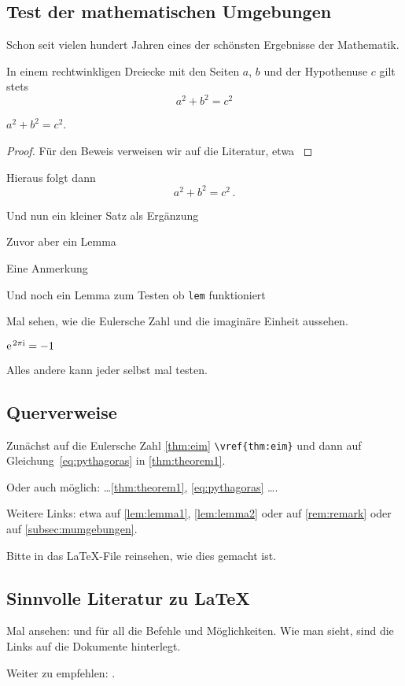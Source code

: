 \subsection{Test der mathematischen Umgebungen}\label{subsec:mumgebungen}
Schon seit vielen hundert Jahren eines der schönsten Ergebnisse der Mathematik.
%
\begin{theorem}\label{thm:theorem1}
In einem rechtwinkligen Dreiecke mit den Seiten $ a $, $ b $ und der Hypothenuse $ c $ gilt stets
\begin{equation}\label{eq:pythagoras}
a^{ 2 } +b^{ 2 } = c^{ 2 }
\end{equation}

$	a^{ 2 } +b^{ 2 } = c^{ 2 } $.
\end{theorem}
%
\begin{proof}
Für den Beweis verweisen wir auf die Literatur, etwa \textcite{efhn:2016}
\end{proof}
\begin{corollary}\label{cor:folgerung}
Hieraus folgt dann 
%
\[
	a^{ 2 } + b^{ 2 } = c^{ 2 } \, .
\]
%
\end{corollary}
%
\begin{proposition}\label{prop:prop}
Und nun ein kleiner Satz als Ergänzung 
\end{proposition}
%
\begin{lemma}\label{lem:lemma1}
Zuvor aber ein Lemma
\end{lemma}
%
\begin{remark}\label{rem:remark}
Eine Anmerkung
\end{remark}
\begin{lem}\label{lem:lemma2}
Und noch ein Lemma zum Testen ob \texttt{lem} funktioniert
\end{lem}
Mal sehen, wie die Eulersche Zahl und die imaginäre Einheit aussehen.
\begin{theorem}\label{thm:eim}
$ \mathrm{e\;\!}^{ 2 \pi \mathrm{i} } = -1 $
\end{theorem}
Alles andere kann jeder selbst mal testen.
%
\subsection{Querverweise}\label{subsec:referenzen}
%
Zunächst auf die Eulersche Zahl \vref{thm:eim} \verb|\vref{thm:eim}| und dann auf Gleichung~\eqref{eq:pythagoras} in \vref{thm:theorem1}.

Oder auch möglich: \ldots \cref{thm:theorem1}, \vref{eq:pythagoras} \ldots.

Weitere Links: etwa auf \vref{lem:lemma1}, \vref{lem:lemma2} oder auf \vref{rem:remark} oder auf \vref{subsec:mumgebungen}.

Bitte in das \LaTeX-File reinsehen, wie dies gemacht ist.
%
\subsection{Sinnvolle Literatur zu \LaTeX}
%
Mal ansehen: \textcite{l2tabu} und \textcite{lshort-german} \bzw \textcite{latex-refsheet} für all die Befehle und Möglichkeiten.
Wie man sieht, sind die Links auf die Dokumente hinterlegt.

Weiter zu empfehlen: \textcite{graetzer:2007}.

